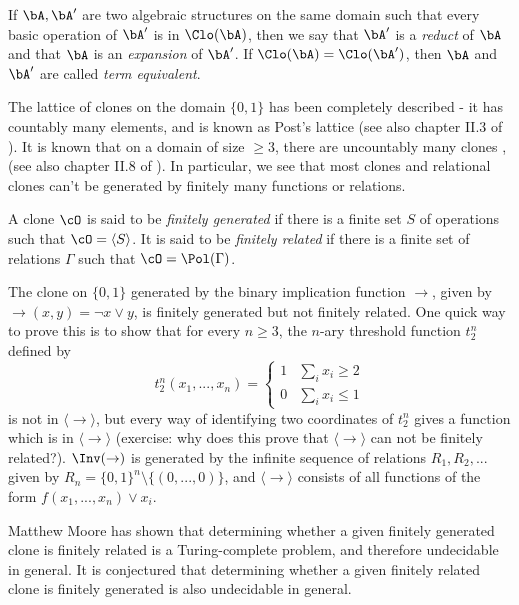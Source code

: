 \begin{defn} If $\bA, \bA'$ are two algebraic structures on the same domain such that every basic operation of $\bA'$ is in $\Clo(\bA)$, then we say that $\bA'$ is a \emph{reduct} of $\bA$ and that $\bA$ is an \emph{expansion} of $\bA'$. If $\Clo(\bA) = \Clo(\bA')$, then $\bA$ and $\bA'$ are called \emph{term equivalent}.
\end{defn}

The lattice of clones on the domain $\{0,1\}$ has been completely described - it has countably many elements, and is known as Post's lattice \cite{post-lattice} (see also chapter II.3 of \cite{lau-clone-theory}). It is known that on a domain of size $\ge 3$, there are uncountably many clones \cite{uncountable-clones}, \cite{zhuk-selfdual} (see also chapter II.8 of \cite{lau-clone-theory}). In particular, we see that most clones and relational clones can't be generated by finitely many functions or relations.

\begin{defn} A clone $\cO$ is said to be \emph{finitely generated} if there is a finite set $S$ of operations such that $\cO = \langle S \rangle$. It is said to be \emph{finitely related} if there is a finite set of relations $\Gamma$ such that $\cO = \Pol(\Gamma)$.
\end{defn}

\begin{ex}\label{ex-non-finitely-related} The clone on $\{0,1\}$ generated by the binary implication function $\to$, given by $\operatorname{\to}(x,y) = \neg x \vee y$, is finitely generated but not finitely related. One quick way to prove this is to show that for every $n \ge 3$, the $n$-ary threshold function $t_2^n$ defined by
\[
t_2^n(x_1, ..., x_n) = \begin{cases} 1 & \sum_i x_i \ge 2\\ 0 & \sum_i x_i \le 1\end{cases}
\]
is not in $\langle \to \rangle$, but every way of identifying two coordinates of $t_2^n$ gives a function which is in $\langle \to \rangle$ (exercise: why does this prove that $\langle \to \rangle$ can not be finitely related?). $\Inv(\to)$ is generated by the infinite sequence of relations $R_1, R_2, ...$ given by $R_n = \{0,1\}^n \setminus \{(0, ..., 0)\}$, and $\langle\to\rangle$ consists of all functions of the form $f(x_1, ..., x_n)\vee x_i$.
\end{ex}

Matthew Moore \cite{finitely-related-undecidable} has shown that determining whether a given finitely generated clone is finitely related is a Turing-complete problem, and therefore undecidable in general. It is conjectured that determining whether a given finitely related clone is finitely generated is also undecidable in general.

